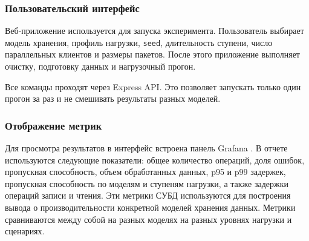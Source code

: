\subsubsection{Пользовательский интерфейс}

Веб-приложение используется для запуска эксперимента. Пользователь выбирает
модель хранения, профиль нагрузки, \texttt{seed}, длительность ступени, число
параллельных клиентов и размеры пакетов. После этого приложение выполняет
очистку, подготовку данных и нагрузочный прогон.

Все команды проходят через Express API. Это позволяет запускать только один
прогон за раз и не смешивать результаты разных моделей.

\subsubsection{Отображение метрик}

Для просмотра результатов в интерфейс встроена панель Grafana
\cite{grafana_database_observability_monitor}. В отчете используются
следующие показатели: общее количество операций, доля ошибок, пропускная
способность, объем обработанных данных, p95 и p99 задержек, пропускная
способность по моделям и ступеням нагрузки, а также задержки операций записи
и чтения. Эти метрики СУБД используются для построения вывода о производительности
конкретной моделей хранения данных.
Метрики сравниваются между собой на разных моделях на разных уровнях нагрузки и
сценариях.
